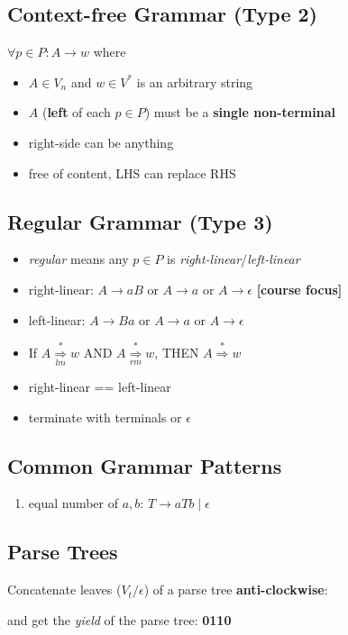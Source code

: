 \documentclass[10pt,a4paper,landscape]{article}
\newcommand{\derive}[2]{\overset{#1}{\underset{#2}{\Rightarrow}}}
\newcommand{\gor}{\;|\;}
\begin{document}
\begin{multicols*}{3}
\subsection*{Context-free Grammar (Type 2)}
\(\forall p \in P: A \rightarrow w\) where
\begin{itemize}
\item \(A \in V_{n}\) and \(w \in V^{*}\) is an arbitrary string
\item \(A\) (\textbf{left} of each \(p \in P\)) must be a \textbf{single non-terminal}
\item right-side can be anything
\item free of content, LHS can replace RHS
\end{itemize}

\subsection*{Regular Grammar (Type 3)}
\begin{itemize}
\item \emph{regular} means any \(p \in P\) is \emph{right-linear}/\emph{left-linear}
\item right-linear: \(A \rightarrow aB\) or \(A \rightarrow a\) or \(A \rightarrow \epsilon\) \textbf{[course focus]}
\item left-linear: \(A \rightarrow Ba\) or \(A \rightarrow a\) or \(A \rightarrow \epsilon\)
\item If \(A \derive{*}{lm} w\) AND \(A \derive{*}{rm} w\), THEN \(A \overset{*}{\Rightarrow} w\)
\item right-linear == left-linear
\item terminate with terminals or \(\epsilon\)
\end{itemize}

\subsection*{Common Grammar Patterns}
\begin{enumerate}
\item equal number of \(a, b\): \(T \rightarrow aTb \gor \epsilon\)
\end{enumerate}

\subsection*{Parse Trees}
Concatenate leaves (\(V_{t}/\epsilon\)) of a parse tree \textbf{anti-clockwise}:
and get the \emph{yield} of the parse tree: \textbf{0110}

\end{multicols*}
\end{document}
